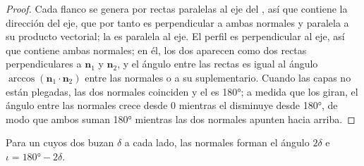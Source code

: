 \begin{proof}
Cada flanco se genera por rectas paralelas al eje del , así que contiene la dirección del eje, que por tanto es
perpendicular a ambas normales y paralela a su producto vectorial; la  es paralela al eje. El perfil es
perpendicular al eje, así que contiene ambas normales; en él, los dos  aparecen como dos rectas perpendiculares a
$\mathbf n_1$ y $\mathbf n_2$, y el ángulo entre las rectas es igual al ángulo
$\arccos(\mathbf n_1\cdot\mathbf n_2)$ entre las normales o a su suplementario. Cuando las capas no están plegadas, las dos
normales coinciden y el  es \ang{180}; a medida que los  giran, el ángulo entre las normales crece
desde $0$ mientras el  disminuye desde \ang{180}, de modo que ambos suman \ang{180} mientras las dos
normales apunten hacia arriba.
\end{proof}

Para un  cuyos dos  buzan $\delta$ a cada lado, las normales forman el ángulo $2\delta$ e
$\iota = \ang{180} - 2\delta$.

